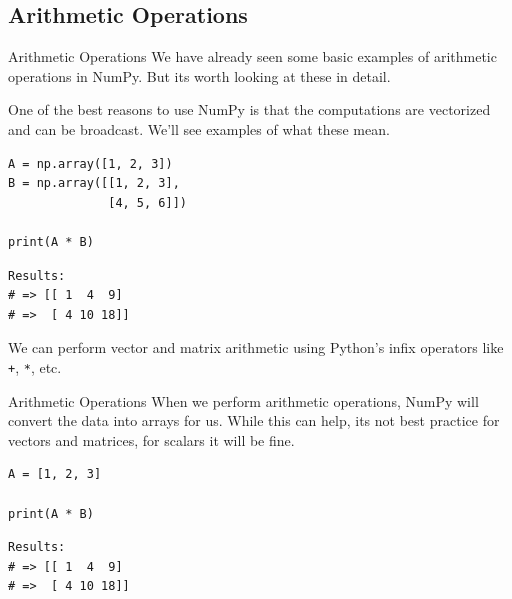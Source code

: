 \documentclass[10pt]{beamer}
\begin{document}
\subsection{Arithmetic Operations}
\label{sec:org3e1f9ff}

\begin{frame}[label={sec:org43bd15f},fragile]{Arithmetic Operations}
 We have already seen some basic examples of arithmetic operations in NumPy. But its
worth looking at these in detail.

One of the best reasons to use NumPy is that the computations are \alert{vectorized} and can
be \alert{broadcast}. We'll see examples of what these mean.

\begin{verbatim}
A = np.array([1, 2, 3])
B = np.array([[1, 2, 3],
              [4, 5, 6]])

print(A * B)
\end{verbatim}

\begin{verbatim}
Results: 
# => [[ 1  4  9]
# =>  [ 4 10 18]]
\end{verbatim}


We can perform vector and matrix arithmetic using Python's infix operators like \texttt{+}, \texttt{*},
etc.
\end{frame}

\begin{frame}[label={sec:org127a5b8},fragile]{Arithmetic Operations}
 When we perform arithmetic operations, NumPy will convert the data into arrays for
us. While this can help, its not best practice for vectors and matrices, for scalars
it will be fine.

\begin{verbatim}
A = [1, 2, 3]

print(A * B)
\end{verbatim}

\begin{verbatim}
Results: 
# => [[ 1  4  9]
# =>  [ 4 10 18]]
\end{verbatim}
\end{frame}
\end{document}
